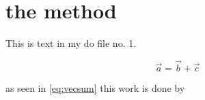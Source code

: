 %

\chapter{the method}
\label{ch:method}

This is text in my do file no. 1.


\begin{equation}
	\vec{a} = \vec{b}+\vec{c}
\label{eq:vecsum}
\end{equation}

as seen in \ref{eq:vecsum} this work is done by \cite{Hesthaven:2010:NDG:1952159}

%
%

%
